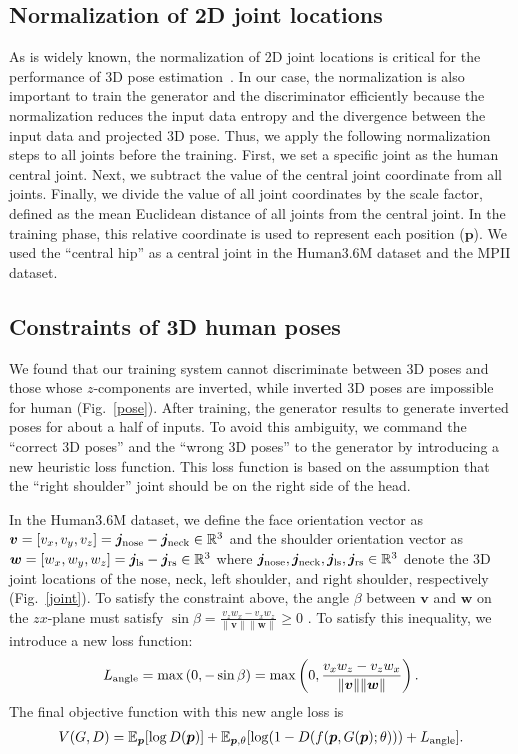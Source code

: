 \documentclass[runningheads]{llncs}
\newcommand{\Fref}[1]{Fig.~\ref{#1}}
\begin{document}
\subsection{Normalization of 2D joint locations}
As is widely known, the normalization of 2D joint locations is critical for the performance of 3D pose estimation~\cite{martinez20173dbaseline,tome2017lifting,zhou2017towards}.
In our case, the normalization is also important to train the generator and the discriminator efficiently because the normalization reduces the input data entropy and the divergence between the input data and projected 3D pose.
Thus, we apply the following normalization steps to all joints before the training.
First, we set a specific joint as the human central joint.
Next, we subtract the value of the central joint coordinate from all joints.
Finally, we divide the value of all joint coordinates by the scale factor, defined as the mean Euclidean distance of all joints from the central joint.
In the training phase, this relative coordinate is used to represent each position (${\bm p}$).
We used the ``central hip'' as a central joint in the Human3.6M dataset and the MPII dataset.


\subsection{Constraints of 3D human poses}
We found that our training system cannot discriminate between 3D poses and those whose $z$-components are inverted, while inverted 3D poses are impossible for human (\Fref{pose}).
After training, the generator results to generate inverted poses for about a half of inputs.
To avoid this ambiguity, we command the ``correct 3D poses'' and the ``wrong 3D poses'' to the generator by introducing a new heuristic loss function.
This loss function is based on the assumption that the ``right shoulder'' joint should be on the right side of the head.

In the Human3.6M dataset, we define the face orientation vector as ${\bm v} = [v_x, v_y, v_z] = {\bm j}_{\rm{nose}} - {\bm j}_{\rm{neck}} \in \mathbb{R}^3$ and the shoulder orientation vector as ${\bm w} = [w_x, w_y, w_z] ={\bm j}_{\rm{ls}} - {\bm j}_{\rm{rs}} \in \mathbb{R}^3$ where ${\bm j}_{\rm{nose}}, {\bm j}_{\rm{neck}}, {\bm j}_{\rm{ls}}, {\bm j}_{\rm{rs}} \in \mathbb{R}^3$ denote the 3D joint locations of the nose, neck, left shoulder, and right shoulder, respectively (\Fref{joint}).
To satisfy the constraint above, the angle $\beta$ between ${\bm v}$ and ${\bm w}$ on the $zx$-plane must satisfy $\sin \beta = \frac{v_z w_x - v_x w_z}{{\| {\bm v} \| \| {\bm w} \| }} \geq 0$ .
To satisfy this inequality, we introduce a new loss function:
\begin{eqnarray}
L_{\rm angle} = \max \left( 0, -\sin \beta \right) = \max \left( 0, \frac{v_x w_z - v_z w_x}{{\| {\bm v} \| \| {\bm w} \| }} \right).
\end{eqnarray}
The final objective function with this new angle loss is
\begin{eqnarray}
V(G, D) = \mathbb{E}_{\bm p}[\log D({\bm p})] + \mathbb{E}_{{\bm p}, \theta}[\log (1 - D(f({\bm p}, G({\bm p}); \theta)))+L_{\rm angle}].
\end{eqnarray}
\end{document}
